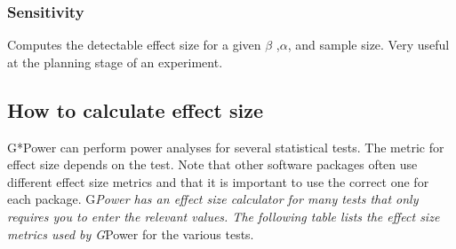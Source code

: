 \documentclass[
  12pt,
]{book}
\begin{document}
\hypertarget{sensitivity}{%
\subsubsection*{Sensitivity}\label{sensitivity}}

Computes the detectable effect size for a given \(\beta\) ,\(\alpha\), and
sample size. Very useful at the planning stage of an experiment.

\hypertarget{how-to-calculate-effect-size}{%
\subsection{How to calculate effect size}\label{how-to-calculate-effect-size}}

G*Power can perform power analyses for several statistical tests.
The metric for effect size depends on the test. Note that other
software packages often use different effect size metrics and that it is
important to use the correct one for each package. G\emph{Power has an
effect size calculator for many tests that only requires you to enter
the relevant values. The following table lists the effect size metrics
used by G}Power for the various tests.
\end{document}
